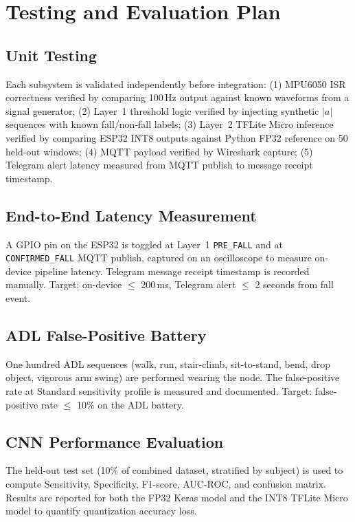 \section{Testing and Evaluation Plan}

\subsection{Unit Testing}

Each subsystem is validated independently before integration: (1) MPU6050 ISR correctness verified by comparing 100\,Hz output against known waveforms from a signal generator; (2) Layer~1 threshold logic verified by injecting synthetic $|a|$ sequences with known fall/non-fall labels; (3) Layer~2 TFLite Micro inference verified by comparing ESP32 INT8 outputs against Python FP32 reference on 50 held-out windows; (4) MQTT payload verified by Wireshark capture; (5) Telegram alert latency measured from MQTT publish to message receipt timestamp.

\subsection{End-to-End Latency Measurement}

A GPIO pin on the ESP32 is toggled at Layer~1 \texttt{PRE\_FALL} and at \texttt{CONFIRMED\_FALL} MQTT publish, captured on an oscilloscope to measure on-device pipeline latency. Telegram message receipt timestamp is recorded manually. Target: on-device $\leq$ 200\,ms, Telegram alert $\leq$ 2 seconds from fall event.

\subsection{ADL False-Positive Battery}

One hundred ADL sequences (walk, run, stair-climb, sit-to-stand, bend, drop object, vigorous arm swing) are performed wearing the node. The false-positive rate at Standard sensitivity profile is measured and documented. Target: false-positive rate $\leq$ 10\% on the ADL battery.

\subsection{CNN Performance Evaluation}

The held-out test set (10\% of combined dataset, stratified by subject) is used to compute Sensitivity, Specificity, F1-score, AUC-ROC, and confusion matrix. Results are reported for both the FP32 Keras model and the INT8 TFLite Micro model to quantify quantization accuracy loss.
